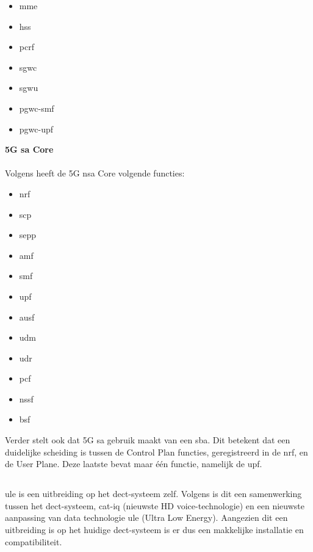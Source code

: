 \begin{itemize}
  \item \gls{mme}
  \item \gls{hss}
  \item \gls{pcrf}
  \item \gls{sgwc}
  \item \gls{sgwu}
  \item \gls{pgwc-smf}
  \item \gls{pgwc-upf}
\end{itemize}

\textbf{5G \gls{sa} Core}\\\\

Volgens \textcite{Lee2025a} heeft de 5G \gls{nsa} Core volgende functies:

\begin{itemize}
  \item \gls{nrf}
  \item \gls{scp}
  \item \gls{sepp}
  \item \gls{amf}
  \item \gls{smf}
  \item \gls{upf}
  \item \gls{ausf}
  \item \gls{udm}
  \item \gls{udr}
  \item \gls{pcf}
  \item \gls{nssf}
  \item \gls{bsf}
\end{itemize}

Verder stelt \textcite{Lee2025a} ook dat 5G \gls{sa} gebruik maakt van een \gls{sba}. Dit betekent dat een duidelijke scheiding is tussen de Control Plan functies, geregistreerd in de \gls{nrf}, en de User Plane. Deze laatste bevat maar \'e\'en functie, namelijk de \gls{upf}.


\subsection{}%
\label{sec:ule}%

\gls{ule} is een uitbreiding op het \gls{dect}-systeem zelf. Volgens \textcite{GariniDil2014} is dit een samenwerking tussen het \gls{dect}-systeem, \gls{cat-iq} (nieuwste HD voice-technologie) en een nieuwste aanpassing van data technologie \gls{ule} (Ultra Low Energy). Aangezien dit een uitbreiding is op het huidige \gls{dect}-systeem is er dus een makkelijke installatie en compatibiliteit.

